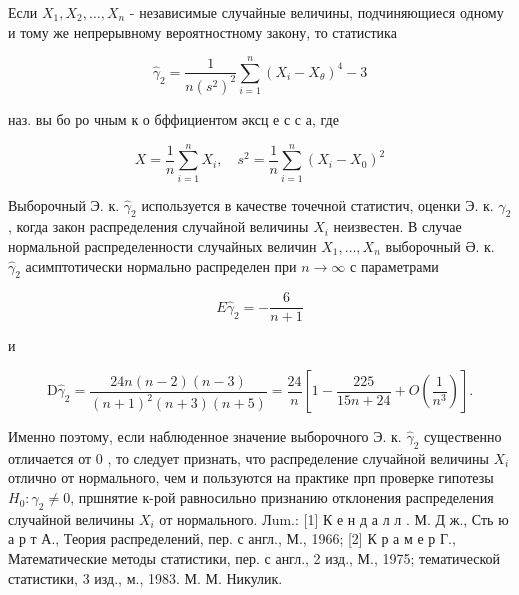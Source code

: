 \documentclass[10pt]{article}
\begin{document}
Если $X_{1}, X_{2}, \ldots, X_{n}$ - независимые случайные величины, подчиняющиеся одному и тому же непрерывному вероятностному закону, то статистика



\[

\hat{\gamma}_{2}=\frac{1}{n\left(s^{2}\right)^{2}} \sum_{i=1}^{n}\left(X_{i}-X_{\theta}\right)^{4}-3

\]



наз. вы бо ро чным к о бффициентом әксц е с с а, где



\[

X=\frac{1}{n} \sum_{i=1}^{n} X_{i}, \quad s^{2}=\frac{1}{n} \sum_{i=1}^{n}\left(X_{i}-X_{0}\right)^{2}

\]



Выборочный Э. к. $\hat{\gamma}_{2}$ используется в качестве точечноӥ статистич, оценки Э. к. $\gamma_{2}$, когда закон распределения случайной величины $X_{i}$ неизвестен. В случае нормальной распределенности случайных величин $X_{1}, \ldots, X_{n}$ выборочный Ә. к. $\hat{\gamma}_{2}$ асимптотически нормально распределен при $n \rightarrow \infty$ с параметрами



\[

E \hat{\gamma}_{2}=-\frac{6}{n+1}

\]



и



\[

\mathrm{D} \hat{\gamma}_{2}=\frac{24 n(n-2)(n-3)}{(n+1)^{2}(n+3)(n+5)}=\frac{24}{n}\left[1-\frac{225}{15 n+24}+O\left(\frac{1}{n^{3}}\right)\right] .

\]



Именно поэтому, если наблюденное значение выборочного Э. к. $\hat{\gamma}_{2}$ существенно отличается от 0 , то следует признать, что распределение случайной величины $X_{i}$ отлично от нормального, чем и пользуются на практике прп проверке гипотезы $H_{0}: \gamma_{2} \neq 0$, пршнятие к-рой равносильно признанию отклонения распределения случайной величины $X_{i}$ от нормального. Лum.: [1] К е н д а л л . М. Д ж., Сть ю а р т А., Теория распределений, пер. с англ., М., 1966; [2] К р а м е р Г., Математические методы статистики, пер. с англ., 2 изд., М., 1975; тематической статистики, 3 изд., м., 1983. М. М. Никулик.
\end{document}
